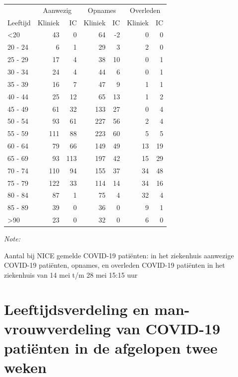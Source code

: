 \documentclass[
  english,
  man,floatsintext]{apa6}
\begin{document}
\begin{table}
\centering\begingroup\fontsize{10}{12}\selectfont

\begin{threeparttable}
\begin{tabular}{lrrrrrr}
\toprule
\multicolumn{1}{c}{ } & \multicolumn{2}{c}{Aanwezig} & \multicolumn{2}{c}{Opnames} & \multicolumn{2}{c}{Overleden} \\
\cmidrule(l{3pt}r{3pt}){2-3} \cmidrule(l{3pt}r{3pt}){4-5} \cmidrule(l{3pt}r{3pt}){6-7}
Leeftijd & Kliniek & IC & Kliniek & IC & Kliniek & IC\\
\midrule
<20 & 43 & 0 & 64 & -2 & 0 & 0\\
20 - 24 & 6 & 1 & 29 & 3 & 2 & 0\\
25 - 29 & 17 & 4 & 38 & 10 & 0 & 1\\
30 - 34 & 24 & 4 & 44 & 6 & 0 & 1\\
35 - 39 & 16 & 7 & 47 & 9 & 1 & 1\\
40 - 44 & 25 & 12 & 65 & 13 & 1 & 2\\
45 - 49 & 61 & 32 & 133 & 27 & 0 & 4\\
50 - 54 & 93 & 61 & 227 & 56 & 2 & 4\\
55 - 59 & 111 & 88 & 223 & 60 & 5 & 5\\
60 - 64 & 79 & 66 & 149 & 49 & 13 & 19\\
65 - 69 & 93 & 113 & 197 & 42 & 15 & 29\\
70 - 74 & 110 & 94 & 155 & 37 & 34 & 48\\
75 - 79 & 122 & 33 & 114 & 14 & 34 & 16\\
80 - 84 & 87 & 1 & 75 & 4 & 32 & 4\\
85 - 89 & 39 & 0 & 36 & 0 & 9 & 1\\
>90 & 23 & 0 & 32 & 0 & 6 & 0\\
\bottomrule
\end{tabular}
\begin{tablenotes}
\item \textit{Note: } 
\item Aantal bij NICE gemelde COVID-19 patiënten: in het ziekenhuis aanwezige COVID-19 patiënten, opnames, en overleden COVID-19 patiënten in het ziekenhuis van 14 mei t/m 28 mei 15:15 uur
\end{tablenotes}
\end{threeparttable}
\endgroup{}
\end{table}

\newpage

\hypertarget{leeftijdsverdeling-en-man-vrouwverdeling-van-covid-19-patiuxebnten-in-de-afgelopen-twee-weken}{%
\section{Leeftijdsverdeling en man-vrouwverdeling van COVID-19 patiënten in de afgelopen twee weken}\label{leeftijdsverdeling-en-man-vrouwverdeling-van-covid-19-patiuxebnten-in-de-afgelopen-twee-weken}}
\end{document}
